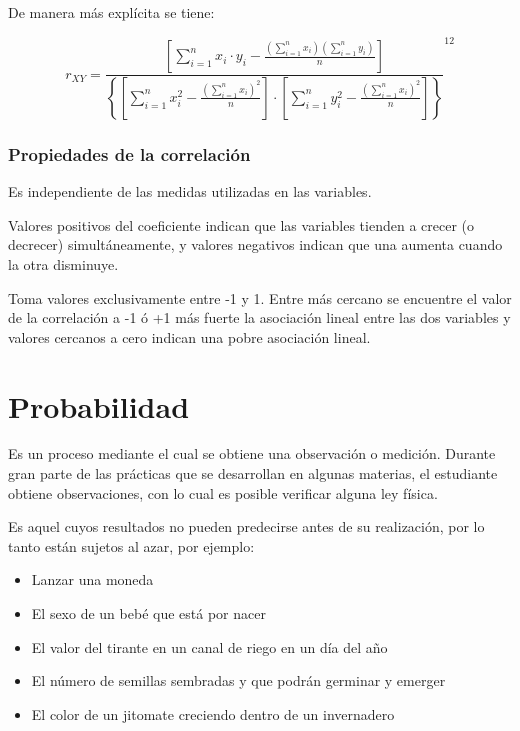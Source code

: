 De manera más explícita se tiene:

\begin{equation}
    r_{XY}= \frac{\left[\sum_{i=1}^n x_i\cdot y_i-\frac{\left(\sum_{i=1}^n x_i\right)\left(\sum_{i=1}^n y_i\right)}{n}\right]}{\left\{\left[\sum_{i=1}^n x_i^2-\frac{\left(\sum_{i=1}^n x_i\right)^2}{n}\right]\cdot\left[\sum_{i=1}^n y_i^2-\frac{\left(\sum_{i=1}^n x_i\right)^2}{n}\right]\right\}}^{12}
\end{equation}

\subsubsection{Propiedades de la correlación}

Es independiente de las medidas utilizadas en las
variables.

Valores positivos del coeficiente indican que las
variables tienden a crecer (o decrecer)
simultáneamente, y valores negativos indican que
una aumenta cuando la otra disminuye.

Toma valores exclusivamente entre -1 y 1. Entre más cercano se encuentre el valor de la
correlación a -1 ó +1 más fuerte la asociación lineal
entre las dos variables y valores cercanos a cero
indican una pobre asociación lineal.


\section{Probabilidad}

\begin{definition}[Experimento]
    Es un proceso mediante el cual se obtiene una observación o medición.
    Durante gran parte de las prácticas que se desarrollan en algunas materias, el estudiante obtiene observaciones, con lo cual es posible verificar alguna ley física.
\end{definition}

\begin{definition}
    Es aquel cuyos resultados no pueden predecirse antes de su realización, por lo tanto están sujetos al azar, por ejemplo:
    \begin{itemize}
        \item Lanzar una moneda
        \item El sexo de un bebé que está por nacer
        \item El valor del tirante en un canal de riego en un día del año
        \item El número de semillas sembradas y que podrán germinar y emerger
        \item El color de un jitomate creciendo dentro de un invernadero
    \end{itemize}
\end{definition}


